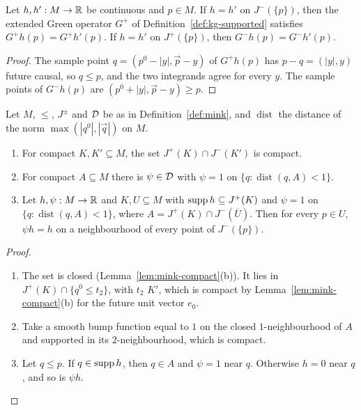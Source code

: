 \begin{lemma}[Causality of $G^\pm$]\label{lem:kg-causal}
Let $h,h':M\to\mathbb R$ be continuous and $p\in M$. If $h=h'$ on $J^-(\{p\})$, then the extended Green operator
$G^+$ of Definition~\ref{def:kg-supported} satisfies $G^+h(p)=G^+h'(p)$. If $h=h'$ on $J^+(\{p\})$,
then $G^-h(p)=G^-h'(p)$.
\end{lemma}
\begin{proof}
The sample point $q=(p^0-|y|,\vec p-y)$ of $G^+h(p)$ has $p-q=(|y|,y)$ future causal, so $q\le p$,
and the two integrands agree for every $y$. The sample points of $G^-h(p)$ are
$(p^0+|y|,\vec p-y)\ge p$.
\end{proof}

\begin{lemma}\label{lem:kg-cutoff}
Let $M$, $\le$, $J^\pm$ and $\mathcal D$ be as in Definition~\ref{def:mink}, and $\operatorname{dist}$ the
distance of the norm $\max(|q^0|,|\vec q|)$ on $M$.
\begin{enumerate}[label=(\alph*),leftmargin=2.5em]
\item For compact $K,K'\subseteq M$, the set $J^+(K)\cap J^-(K')$ is compact.
\item For compact $A\subseteq M$ there is $\psi\in\mathcal D$ with $\psi=1$ on
$\{q:\operatorname{dist}(q,A)<1\}$.
\item Let $h,\psi:M\to\mathbb R$ and $K,U\subseteq M$ with $\operatorname{supp} h\subseteq J^+(K)$ and $\psi=1$ on
$\{q:\operatorname{dist}(q,A)<1\}$, where $A=J^+(K)\cap J^-(\overline U)$. Then for every $p\in U$, $\psi h=h$ on a
neighbourhood of every point of $J^-(\{p\})$.
\end{enumerate}
\end{lemma}
\begin{proof}
\begin{enumerate}[leftmargin=2.5em]
\item[(a)] The set is closed (Lemma~\ref{lem:mink-compact}(b)). It lies in
$J^+(K)\cap\{q^0\le t_2\}$, with $t_2$  $K'$, which is compact by
Lemma~\ref{lem:mink-compact}(b) for the future unit vector $e_0$.
\item[(b)] Take a smooth bump function equal to $1$ on the closed $1$-neighbourhood of $A$ and supported in
its $2$-neighbourhood, which is compact.
\item[(c)] Let $q\le p$. If $q\in\operatorname{supp} h$, then $q\in A$ and $\psi=1$ near $q$. Otherwise $h=0$ near
$q$, and so is $\psi h$.
\end{enumerate}
\end{proof}

